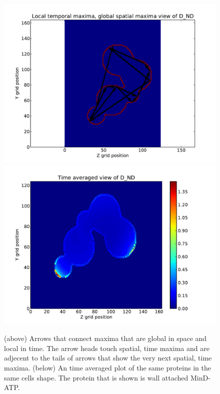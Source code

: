 \documentclass[letterpaper,twocolumn,amsmath,amssymb,pre]{revtex4-1}
\begin{document}
\begin{figure}
  \includegraphics[width=\columnwidth]{../data/shape-randst/plots/arrow-plot-D_ND-randst-25-600-800-9800-1500}
  \includegraphics[width=\columnwidth]{../data/shape-randst/plots/time-map-D_ND-randst-25-600-800-9800-1500}
  \caption{(above) Arrows that connect maxima that are global in space
    and local in time. The arrow heads touch spatial, time maxima and
    are adjecent to the tails of arrows that show the very next
    spatial, time maxima. (below) An time averaged plot of the same
    proteins in the same cells shape.  The protein that is shown is
    wall attached MinD-ATP.}
  \label{arrow-plot-randst-98-plot}
\end{figure}
\end{document}
